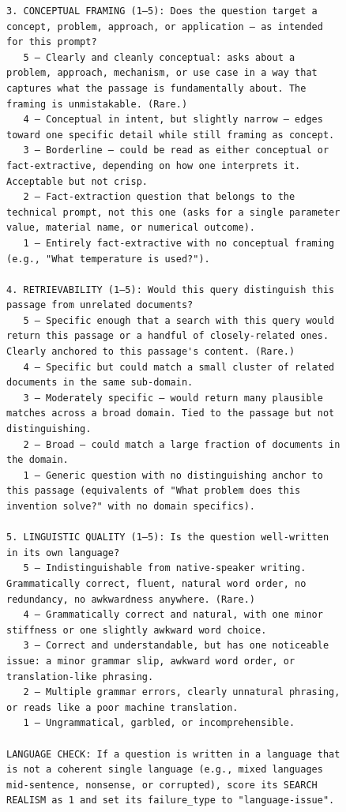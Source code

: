 \begin{figure}[h!]
\begin{minipage}{0.95\textwidth}
\begin{Verbatim}[breaklines=true, breakanywhere=true]
3. CONCEPTUAL FRAMING (1–5): Does the question target a concept, problem, approach, or application — as intended for this prompt?
   5 — Clearly and cleanly conceptual: asks about a problem, approach, mechanism, or use case in a way that captures what the passage is fundamentally about. The framing is unmistakable. (Rare.)
   4 — Conceptual in intent, but slightly narrow — edges toward one specific detail while still framing as concept.
   3 — Borderline — could be read as either conceptual or fact-extractive, depending on how one interprets it. Acceptable but not crisp.
   2 — Fact-extraction question that belongs to the technical prompt, not this one (asks for a single parameter value, material name, or numerical outcome).
   1 — Entirely fact-extractive with no conceptual framing (e.g., "What temperature is used?").

4. RETRIEVABILITY (1–5): Would this query distinguish this passage from unrelated documents?
   5 — Specific enough that a search with this query would return this passage or a handful of closely-related ones. Clearly anchored to this passage's content. (Rare.)
   4 — Specific but could match a small cluster of related documents in the same sub-domain.
   3 — Moderately specific — would return many plausible matches across a broad domain. Tied to the passage but not distinguishing.
   2 — Broad — could match a large fraction of documents in the domain.
   1 — Generic question with no distinguishing anchor to this passage (equivalents of "What problem does this invention solve?" with no domain specifics).

5. LINGUISTIC QUALITY (1–5): Is the question well-written in its own language?
   5 — Indistinguishable from native-speaker writing. Grammatically correct, fluent, natural word order, no redundancy, no awkwardness anywhere. (Rare.)
   4 — Grammatically correct and natural, with one minor stiffness or one slightly awkward word choice.
   3 — Correct and understandable, but has one noticeable issue: a minor grammar slip, awkward word order, or translation-like phrasing.
   2 — Multiple grammar errors, clearly unnatural phrasing, or reads like a poor machine translation.
   1 — Ungrammatical, garbled, or incomprehensible.

LANGUAGE CHECK: If a question is written in a language that is not a coherent single language (e.g., mixed languages mid-sentence, nonsense, or corrupted), score its SEARCH REALISM as 1 and set its failure_type to "language-issue".


\end{Verbatim}
\end{minipage}
\end{figure}
